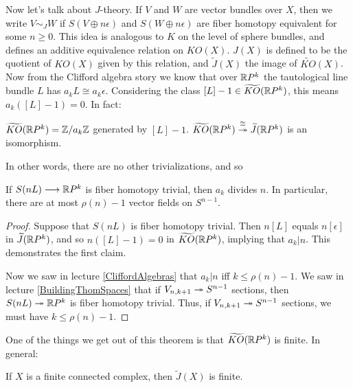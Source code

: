 Now let's talk about $J$-theory.  If $V$ and $W$ are vector bundles over $X$, then we write $V \sim_J W$ if $S(V \oplus n \epsilon)$ and $S(W \oplus n \epsilon)$ are fiber homotopy equivalent for some $n\geq0$. This idea is analogous to $K$ on the level of sphere bundles, and defines an additive equivalence relation on $KO(X)$. $J(X)$ is defined to be the quotient of $KO(X)$ given by this relation, and $\widetilde J(X)$ the image of $\widetilde{KO}(X)$. %
Now from the Clifford algebra story we know that over $\mathbb{R} P^k$ the tautological line bundle $L$ has $a_k L \cong a_k \epsilon$. %
Considering the class $[L] - 1 \in \widetilde{KO}(\mathbb{R} P^k)$, this means $a_k([L] - 1) = 0$. In fact: %
\begin{thm}[Adams]\label{AdamsKORPn}
$\widetilde{KO}(\mathbb{R} P^k)=\mathbb{Z}/a_k\mathbb{Z}$ generated by $[L]-1$.
$\widetilde{KO}(\mathbb{R} P^k) \stackrel{\cong}{\twoheadrightarrow} \widetilde J(\mathbb{R} P^k)$ is an isomorphism.
\end{thm}
In other words, there are no other trivializations, and so %
\begin{cor}
If $S(nL) \longrightarrow \mathbb{R} P^k$ is fiber homotopy trivial, then $a_k$ divides $n$. In particular, there are at most $\rho(n) - 1$ vector fields on $S^{n-1}$. %
\end{cor}
\begin{proof}
Suppose that $S(nL)$ is fiber homotopy trivial. Then $n[L]$ equals $n[\epsilon]$ in $\widetilde J(\mathbb{R} P^k)$, and so $n([L]-1)=0$ in $\widetilde{KO}(\mathbb{R} P^k)$, implying that $a_k|n$. This demonstrates the first claim.

Now we saw in lecture \ref{CliffordAlgebras} that $a_k|n$ iff $k\leq \rho(n)-1$. We saw in lecture \ref{BuildingThomSpaces} that if $V_{n, k+1} \twoheadrightarrow S^{n-1}$ sections, then $S(nL)\twoheadrightarrow \mathbb{R} P^{k}$ is fiber homotopy trivial. Thus, if $V_{n, k+1} \twoheadrightarrow S^{n-1}$ sections, we must have $k\leq\rho(n)-1$.
\end{proof}
One of the things we get out of this theorem is that $\widetilde{KO}(\mathbb{R} P^k)$ is finite. In general: %
\begin{thm}[Atiyah]
If $X$ is a finite connected complex, then $\widetilde J(X)$ is finite.
\end{thm}
